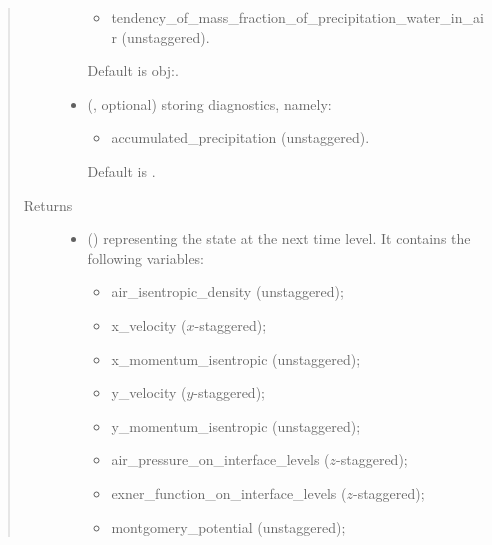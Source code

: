 \documentclass[letterpaper,10pt,english]{sphinxmanual}
\begin{document}
\begin{fulllineitems}
\begin{fulllineitems}
\begin{quote}
\begin{description}
\begin{itemize}
\begin{itemize}
\item {} 
tendency\_of\_mass\_fraction\_of\_precipitation\_water\_in\_air (unstaggered).

\end{itemize}

Default is obj:.


\item {} 
 (, optional) \textendash{} 
{\hyperref[\detokenize{api:storages.grid_data.GridData}]{}} storing diagnostics, namely:
\begin{itemize}
\item {} 
accumulated\_precipitation (unstaggered).

\end{itemize}

Default is .


\end{itemize}

\item[{Returns}] \leavevmode
\begin{itemize}
\item {} 
 () \textendash{} {\hyperref[\detokenize{api:storages.state_isentropic.StateIsentropic}]{}} representing the state at the next time level.
It contains the following variables:
\begin{itemize}
\item {} 
air\_isentropic\_density (unstaggered);

\item {} 
x\_velocity (\(x\)-staggered);

\item {} 
x\_momentum\_isentropic (unstaggered);

\item {} 
y\_velocity (\(y\)-staggered);

\item {} 
y\_momentum\_isentropic (unstaggered);

\item {} 
air\_pressure\_on\_interface\_levels (\(z\)-staggered);

\item {} 
exner\_function\_on\_interface\_levels (\(z\)-staggered);

\item {} 
montgomery\_potential (unstaggered);


\end{itemize}
\end{itemize}
\end{description}
\end{quote}
\end{fulllineitems}
\end{fulllineitems}
\end{document}
